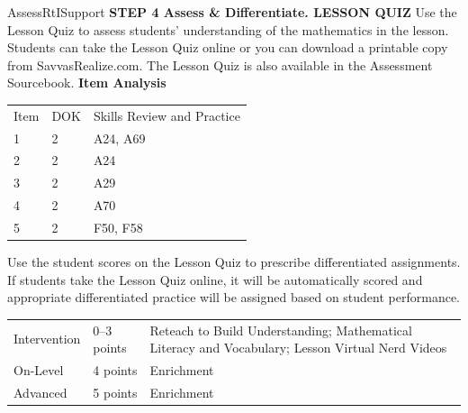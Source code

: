 \documentclass{article}
\newenvironment{te-addendum}[2]{}{}     %
\newcommand{\te}[1]{}                   %
\begin{document}
\begin{te-addendum}{Assess}{RtISupport}
\textbf{STEP 4 Assess \& Differentiate. LESSON QUIZ}
Use the Lesson Quiz to assess students' understanding of the mathematics in the lesson.
Students can take the Lesson Quiz online or you can download a printable copy from SavvasRealize.com. The Lesson Quiz is also available in the Assessment Sourcebook.
\textbf{Item Analysis}
\begin{tabular}{lll}
Item & DOK & Skills Review and Practice \\
1 & 2 & A24, A69 \\
2 & 2 & A24 \\
3 & 2 & A29 \\
4 & 2 & A70 \\
5 & 2 & F50, F58 \\
\end{tabular}
Use the student scores on the Lesson Quiz to prescribe differentiated assignments.
If students take the Lesson Quiz online, it will be automatically scored and appropriate differentiated practice will be assigned based on student performance.
\begin{tabular}{lll}
Intervention & 0--3 points & Reteach to Build Understanding; Mathematical Literacy and Vocabulary; Lesson Virtual Nerd Videos \\
On-Level & 4 points & Enrichment \\
Advanced & 5 points & Enrichment \\
\end{tabular}
\te{Lesson Quiz is available at SavvasRealize.com. ASSESSMENT RESOURCES.}
\end{te-addendum}
\end{document}
